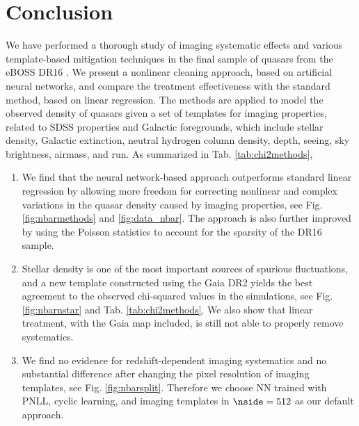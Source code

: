 \section{Conclusion}\label{sec:conclusion}
We have performed a thorough study of imaging systematic effects and various template-based mitigation techniques in the final sample of quasars \citep{lyke2020dr16qso, ross2020lss} from the eBOSS DR16 \citep{Ahumada2020ApJS}. We present a nonlinear cleaning approach, based on artificial neural networks, and compare the treatment effectiveness with the standard method, based on linear regression. The methods are applied to model the observed density of quasars given a set of templates for imaging properties, related to SDSS properties and Galactic foregrounds, which include stellar density, Galactic extinction, neutral hydrogen column density, depth, seeing, sky brightness, airmass, and run. As summarized in Tab. \ref{tab:chi2methods},
\begin{enumerate}[leftmargin=1\parindent]
    \item We find that the neural network-based approach outperforms standard linear regression by allowing more freedom for correcting nonlinear and complex variations in the quasar density caused by imaging properties, see Fig. \ref{fig:nbarmethods} and \ref{fig:data_nbar}. The approach is also further improved by using the Poisson statistics to account for the sparsity of the DR16 sample.
    
    \item Stellar density is one of the most important sources of spurious fluctuations, and a new template constructed using the Gaia DR2 \citep{gaia2018} yields the best agreement to the observed chi-squared values in the simulations, see Fig. \ref{fig:nbarnstar} and Tab. \ref{tab:chi2methods}. We also show that linear treatment, with the Gaia map included, is still not able to properly remove systematics.
    
    \item We find no evidence for redshift-dependent imaging systematics and no substantial difference after changing the pixel resolution of imaging templates, see Fig. \ref{fig:nbarsplit}. Therefore we choose NN trained with PNLL, cyclic learning, and imaging templates in $\nside=512$ as our default approach.
    
\end{enumerate}

